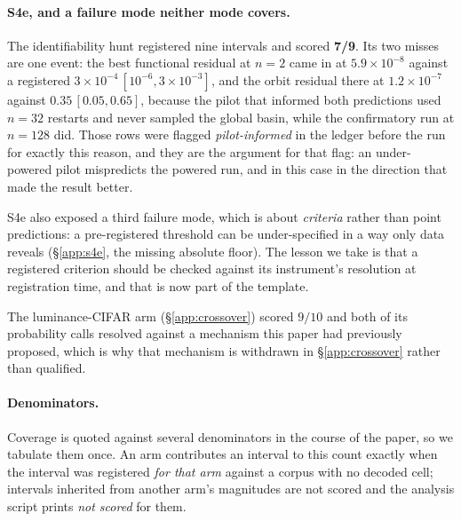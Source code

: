 \paragraph{S4e, and a failure mode neither mode covers.} The identifiability hunt registered nine
intervals and scored \textbf{7/9}. Its two misses are one event: the best functional residual at
$n=2$ came in at $5.9\times10^{-8}$ against a registered $3\times10^{-4}\,[10^{-6}, 3\times10^{-3}]$,
and the orbit residual there at $1.2\times10^{-7}$ against $0.35\,[0.05, 0.65]$, because the pilot that informed both predictions used $n=32$ restarts and never sampled the global basin, while
the confirmatory run at $n=128$ did. Those rows were flagged \emph{pilot-informed} in the ledger
before the run for exactly this reason, and they are the argument for that flag: an under-powered
pilot mispredicts the powered run, and in this case in the direction that made the result better.

S4e also exposed a third failure mode, which is about \emph{criteria} rather than point
predictions: a pre-registered threshold can be under-specified in a way only data reveals
(\S\ref{app:s4e}, the missing absolute floor). The lesson we take is that a registered criterion
should be checked against its instrument's resolution at registration time, and that is now part of
the template.

The luminance-CIFAR arm (\S\ref{app:crossover}) scored $9/10$ and both of its probability calls
resolved against a mechanism this paper had previously proposed, which is why that mechanism is
withdrawn in \S\ref{app:crossover} rather than qualified.

\paragraph{Denominators.} Coverage is quoted against several denominators in the course of the
paper, so we tabulate them once. An arm contributes an interval to this count exactly when the
interval was registered \emph{for that arm} against a corpus with no decoded cell; intervals
inherited from another arm's magnitudes are not scored and the analysis script prints
\emph{not scored} for them.

